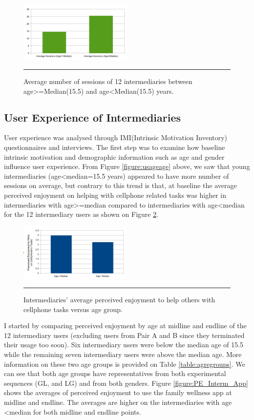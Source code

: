 \begin{figure}[htbp]
  \centering
    \includegraphics[width=0.5\textwidth]{Figures/session_age.png}
    \rule{35em}{0.5pt}
  \caption{Average number of sessions of 12 intermediaries between age\textgreater=Median(15.5) and age\textless Median(15.5) years.}
  \label{figure:usagegender}
\end{figure}\newline
\subsection{User Experience of Intermediaries}
User experience was analysed through IMI(Intrinsic Motivation Inventory) questionnaires and interviews. The first step was to examine how baseline intrinsic motivation and  demographic information such as age and gender influence user experience. From Figure \ref{figure:usageage} above, we saw that young intermediaries (age\textless median=15.5 years) appeared to have more number of sessions on average, but contrary to this trend is that, at baseline the average perceived enjoyment on helping with cellphone related tasks was higher in intermediaries with age\textgreater=median compared to intermediaries with age\textless median for the 12 intermediary users as shown on Figure \ref{figure:PE_HELP_Age}. 
\begin{figure}[htbp]
  \centering
    \includegraphics[width=0.5\textwidth]{Figures/PE_HELP_Age.png}
    \rule{35em}{0.5pt}
  \caption{Intermediaries' average perceived enjoyment to help others with cellphone tasks versus age group.}
  \label{figure:PE_HELP_Age}
\end{figure}\newline
I started by comparing perceived enjoyment by age at midline and endline of the 12 intermediary users (excluding users from Pair A and B since they terminated their usage too soon). Six intermediary users were below the median age of 15.5 while the remaining seven intermediary users were above the median age. More information on these two age groups is provided on Table \ref{table:agregroups}. We can see that both age groups have representatives from both experimental sequences (GL, and LG) and from both genders. Figure \ref{figure:PE_Interm_App} shows the averages of perceived enjoyment to use the family wellness app at midline and endline. The averages are higher on the intermediaries with age \textless median for both midline and endline points. \newline
